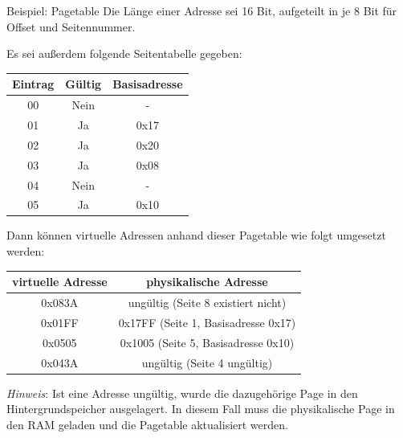 \documentclass[german]{spicker}
\begin{document}
\begin{bonus}{Beispiel: Pagetable}
    Die Länge einer Adresse sei 16 Bit, aufgeteilt in je 8 Bit für Offset und Seitennummer.

    Es sei außerdem folgende Seitentabelle gegeben:

    \begin{center}
        \begin{tabular}{|c|c|c|}
            \hline
            \textbf{Eintrag} & \textbf{Gültig} & \textbf{Basisadresse} \\
            \hline
            00               & Nein            & -                     \\
            01               & Ja              & 0x17                  \\
            02               & Ja              & 0x20                  \\
            03               & Ja              & 0x08                  \\
            04               & Nein            & -                     \\
            05               & Ja              & 0x10                  \\
            \hline
        \end{tabular}
    \end{center}

    Dann können virtuelle Adressen anhand dieser Pagetable wie folgt umgesetzt werden:

    \begin{center}
        \begin{tabular}{|c|c|}
            \hline
            \textbf{virtuelle Adresse} & \textbf{physikalische Adresse}      \\
            \hline
            0x083A                     & ungültig (Seite 8 existiert nicht)  \\
            0x01FF                     & 0x17FF (Seite 1, Basisadresse 0x17) \\
            0x0505                     & 0x1005 (Seite 5, Basisadresse 0x10) \\
            0x043A                     & ungültig (Seite 4 ungültig)         \\
            \hline
        \end{tabular}
    \end{center}

    \emph{Hinweis}: Ist eine Adresse ungültig, wurde die dazugehörige Page in den Hintergrundspeicher ausgelagert. In diesem Fall muss die physikalische Page in den RAM geladen und die Pagetable aktualisiert werden.
\end{bonus}
\end{document}
